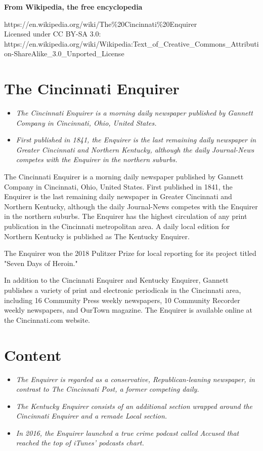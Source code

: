 \textbf{From Wikipedia, the free encyclopedia}

https://en.wikipedia.org/wiki/The\%20Cincinnati\%20Enquirer\\
Licensed under CC BY-SA 3.0:\\
https://en.wikipedia.org/wiki/Wikipedia:Text\_of\_Creative\_Commons\_Attribution-ShareAlike\_3.0\_Unported\_License

\section{The Cincinnati Enquirer}\label{the-cincinnati-enquirer}

\begin{itemize}
\item
  \emph{The Cincinnati Enquirer is a morning daily newspaper published
  by Gannett Company in Cincinnati, Ohio, United States.}
\item
  \emph{First published in 1841, the Enquirer is the last remaining
  daily newspaper in Greater Cincinnati and Northern Kentucky, although
  the daily Journal-News competes with the Enquirer in the northern
  suburbs.}
\end{itemize}

The Cincinnati Enquirer is a morning daily newspaper published by
Gannett Company in Cincinnati, Ohio, United States. First published in
1841, the Enquirer is the last remaining daily newspaper in Greater
Cincinnati and Northern Kentucky, although the daily Journal-News
competes with the Enquirer in the northern suburbs. The Enquirer has the
highest circulation of any print publication in the Cincinnati
metropolitan area. A daily local edition for Northern Kentucky is
published as The Kentucky Enquirer.

The Enquirer won the 2018 Pulitzer Prize for local reporting for its
project titled "Seven Days of Heroin."

In addition to the Cincinnati Enquirer and Kentucky Enquirer, Gannett
publishes a variety of print and electronic periodicals in the
Cincinnati area, including 16 Community Press weekly newspapers, 10
Community Recorder weekly newspapers, and OurTown magazine. The Enquirer
is available online at the Cincinnati.com website.

\section{Content}\label{content}

\begin{itemize}
\item
  \emph{The Enquirer is regarded as a conservative, Republican-leaning
  newspaper, in contrast to The Cincinnati Post, a former competing
  daily.}
\item
  \emph{The Kentucky Enquirer consists of an additional section wrapped
  around the Cincinnati Enquirer and a remade Local section.}
\item
  \emph{In 2016, the Enquirer launched a true crime podcast called
  Accused that reached the top of iTunes' podcasts chart.}
\end{itemize}

